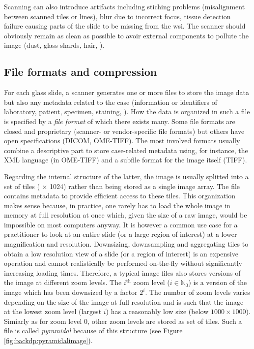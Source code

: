 Scanning can also introduce artifacts including stiching problems (\ie misalignment between scanned tiles or lines), blur due to incorrect focus, tissue detection failure causing parts of the slide to be missing from the \acrshort{wsi}. The scanner should obviously remain as clean as possible to avoir external components to pollute the image (\eg dust, glass shards, hair, \etc). 

\subsection{File formats and compression}
\label{ssec:backdp:storingviewing}

For each glass slide, a scanner generates one or more files to store the image data but also any metadata related to the case (information or identifiers of laboratory, patient, specimen, staining, \etc). How the data is organized in such a file is specified by a \textit{file format} of which there exists many. Some file formats are closed and proprietary (\eg scanner- or vendor-specific file formats) but others have open specifications (\eg DICOM, OME-TIFF). The most involved formats usually combine a descriptive part to store case-related metadata using, for instance, the XML language (\eg in OME-TIFF) and a subfile format for the image itself (\eg TIFF). 

Regarding the internal structure of the latter, the image is usually splitted into a set of tiles ( $\times$ 1024) rather than being stored as a single image array. The file contains metadata to provide efficient access to these tiles. This organization makes sense because, in practice, one rarely has to load the whole image in memory at full resolution at once which, given the size of a raw image, would be impossible on most computers anyway. It is however a common use case for a practitioner to look at an entire slide (or a large region of interest) at a lower magnification and resolution. Downsizing, downsampling and aggregating tiles to obtain a low resolution view of a slide (or a region of interest) is an expensive operation and cannot realistically be performed on-the-fly without significantly increasing loading times. Therefore, a typical image files also stores versions of the image at different zoom levels. The $i^{\text{th}}$ zoom level ($i \in \mathbb{N}_0$) is a version of the image which has been downsized by a factor $2^i$. The number of zoom levels varies depending on the size of the image at full resolution and is such that the image at the lowest zoom level (\ie largest $i$) has a reasonably low size (\eg below $1000 \times 1000$). Simiarly as for zoom level 0, other zoom levels are stored as set of tiles. Such a file is called \textit{pyramidal} because of this structure (see Figure \ref{fig:backdp:pyramidalimage}).

